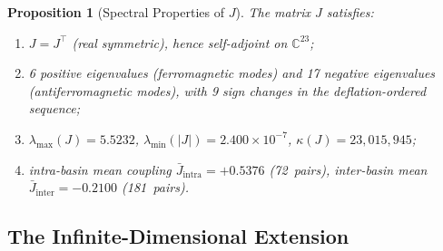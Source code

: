 \documentclass[11pt,a4paper]{article}
\theoremstyle{plain}
\newtheorem{proposition}[theorem]{Proposition}
\theoremstyle{remark}
\newcommand{\C}{\mathbb{C}}
\newcommand{\abs}[1]{\lvert #1 \rvert}
\begin{document}
\begin{proposition}[Spectral Properties of $J$]\label{prop:J-spectrum}
The matrix $J$ satisfies:
\begin{enumerate}[nosep,label=(\roman*)]
  \item $J=J^\top$ (real symmetric), hence self-adjoint on $\C^{23}$;
  \item 6 positive eigenvalues (ferromagnetic modes) and 17 negative
        eigenvalues (antiferromagnetic modes), with 9 sign changes in the
        deflation-ordered sequence;
  \item $\lambda_{\max}(J)=5.5232$,
        $\lambda_{\min}(\abs{J})=2.400\times 10^{-7}$,
        $\kappa(J)=23{,}015{,}945$;
  \item intra-basin mean coupling $\bar J_{\mathrm{intra}}=+0.5376$
        (72~pairs), inter-basin mean $\bar J_{\mathrm{inter}}=-0.2100$
        (181~pairs).
\end{enumerate}
\end{proposition}

\subsection{The Infinite-Dimensional Extension}
\label{sec:extension}
\end{document}
